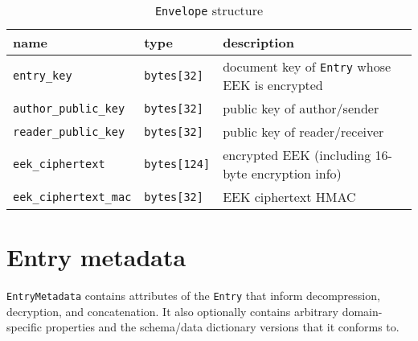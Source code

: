 \documentclass[10pt]{article}
\newcommand{\ttt}[1]{\texttt{#1}}
\def\Entry{\ttt{Entry}}
\def\Envelope{\ttt{Envelope}}
\begin{document}
\begin{appendices}
\begin{table}[htbp]
	\caption*{\Envelope{} structure}
	\begin{small}
	\begin{tabular}{lll}
		\toprule
		name & type  & description \\ \midrule
		\ttt{entry\_key} & \ttt{bytes[32]} & document key of \Entry{} whose EEK is encrypted \\
		\ttt{author\_public\_key} & \ttt{bytes[32]} & public key of author/sender \\
		\ttt{reader\_public\_key} & \ttt{bytes[32]} & public key of reader/receiver \\
		\ttt{eek\_ciphertext}  & \ttt{bytes[124]} & encrypted EEK (including 16-byte encryption info) \\
		\ttt{eek\_ciphertext\_mac} & \ttt{bytes[32]} & EEK ciphertext HMAC \\
		\bottomrule
	\end{tabular}
	\end{small}
\end{table}

\section{Entry metadata}
\label{app:entry-meta}

\ttt{EntryMetadata} contains attributes of the \Entry{} that inform decompression, decryption, and concatenation. It also optionally contains arbitrary domain-specific properties and the schema/data dictionary versions that it conforms to.


\end{appendices}
\end{document}
